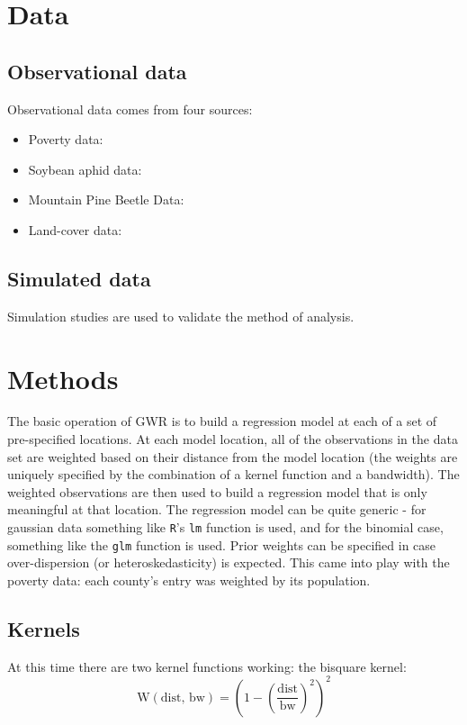 \documentclass[10pt]{amsart}
\begin{document}
\section{Data}
	\subsection{Observational data}
		Observational data comes from four sources:\\
		
		\begin{itemize}
			\item Poverty data: \\
			\item Soybean aphid data: \\
			\item Mountain Pine Beetle Data: \\
			\item Land-cover data: \\
		\end{itemize}
  
	\subsection{Simulated data}
		Simulation studies are used to validate the method of analysis.\\
	

\section{Methods}
	The basic operation of GWR is to build a regression model at each of a set of pre-specified locations. At each model location, all of the observations in the data set are weighted based on their distance from the model location (the weights are uniquely specified by the combination of a kernel function and a bandwidth). The weighted observations are then used to build a regression model that is only meaningful at that location. The regression model can be quite generic - for gaussian data something like \verb!R!'s \verb!lm! function is used, and for the binomial case, something like the \verb!glm! function is used. Prior weights can be specified in case over-dispersion (or heteroskedasticity) is expected. This came into play with the poverty data: each county's entry was weighted by its population.\\

	\subsection{Kernels}
		At this time there are two kernel functions working: the bisquare kernel:
		\[
			\text{W}(\text{dist, bw}) = (1-(\frac{\text{dist}}{\text{bw}})^2)^2
		\]
\end{document}

